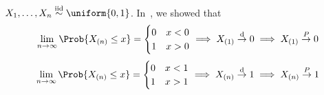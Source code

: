 \begin{Example}{}{}
    $ X_1,\ldots,X_n \stackrel{\text{iid}}{\sim}\uniform{0,1} $.
    In~, we showed that
    \[ \lim\limits_{{n} \to {\infty}} \Prob{X_{(n)}\le x}=
        \begin{cases}
            0 & x<0 \\
            1 & x>0
        \end{cases}\implies X_{(1)}\stackrel{\text{d}}{\to}0
        \implies X_{(1)}\stackrel{\mathbb{P}}{\to}0 \]
    \[ \lim\limits_{{n} \to {\infty}} \Prob{X_{(n)}\le x}=
        \begin{cases}
            0 & x<1 \\
            1 & x>1
        \end{cases}\implies X_{(n)}\stackrel{\text{d}}{\to}1\implies
        X_{(n)}\stackrel{\mathbb{P}}{\to}1 \]
\end{Example}
